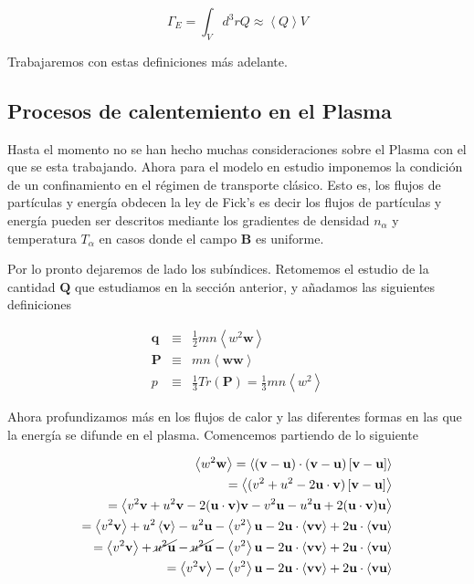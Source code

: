 \documentclass[11pt]{article}
\theoremstyle{definition}
\begin{document}
    \begin{equation}
      \Gamma_E = \int_Vd^3r Q \approx \left<Q\right>V
    \end{equation}

    Trabajaremos con estas definiciones m\'as adelante.

  \subsection{Procesos de calentemiento en el Plasma}

  Hasta el momento no se han hecho muchas consideraciones sobre el Plasma con el que se esta trabajando. Ahora para el modelo en estudio imponemos la condici\'on de un confinamiento en el r\'egimen de transporte cl\'asico. Esto es, los flujos de part\'iculas y energía obdecen la ley de Fick's es decir los flujos de part\'iculas y energ\'ia pueden ser descritos mediante los gradientes de densidad $n_\alpha$ y temperatura $T_\alpha$ en casos donde el campo $\textbf{B}$ es uniforme.

  Por lo pronto dejaremos de lado los sub\'indices. Retomemos el estudio de la cantidad $\textbf{Q}$ que estudiamos en la secci\'on anterior, y añadamos las siguientes definiciones

  \begin{eqnarray}
    \textbf{q} &\equiv& \frac{1}{2}mn\left<w^2\textbf{w}\right>\label{eq:q} \\
    \textbf{P} &\equiv&  mn\left<\textbf{ww}\right>\label{eq:tensorP} \\
    p &\equiv& \frac{1}{3}Tr(\textbf{P}) = \frac{1}{3}mn\left<w^2\right> \label{eq:pressureanisotropic}
  \end{eqnarray}

  Ahora profundizamos m\'as en los flujos de calor y las diferentes formas en las que la energ\'ia se difunde en el plasma. Comencemos partiendo de lo siguiente

  \begin{eqnarray*}
    \left<w^2\textbf{w}\right> = \left<(\textbf{v} - \textbf{u})\cdot(\textbf{v} - \textbf{u})\left[\textbf{v} - \textbf{u}\right]\right> \\
    = \left<(v^2 + u^2 - 2\textbf{u}\cdot\textbf{v})\left[\textbf{v}-\textbf{u}\right]\right> \\
    = \left< v^2\textbf{v} + u^2\textbf{v} - 2(\textbf{u}\cdot\textbf{v})\textbf{v} - v^2\textbf{u} - u^2\textbf{u} + 2(\textbf{u}\cdot\textbf{v})\textbf{u}\right>\\
    = \left<v^2\textbf{v}\right> + u^2\left<\textbf{v}\right> - u^2\textbf{u} - \left<v^2\right>\textbf{u} - 2\textbf{u}\cdot\left<\textbf{vv}\right> + 2\textbf{u}\cdot\left<\textbf{vu}\right>\\
    = \left<v^2\textbf{v}\right> + \cancel{u^2\textbf{u}} - \cancel{u^2\textbf{u}} - \left<v^2\right>\textbf{u} - 2\textbf{u}\cdot\left<\textbf{vv}\right> + 2\textbf{u}\cdot\left<\textbf{vu}\right>\\
    = \left<v^2\textbf{v}\right> -\left<v^2\right>\textbf{u} - 2\textbf{u}\cdot\left<\textbf{vv}\right> + 2\textbf{u}\cdot\left<\textbf{vu}\right>
  \end{eqnarray*}
\end{document}
